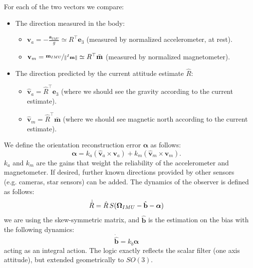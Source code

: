 \documentclass[10pt, a4paper]{report}
\begin{document}
\noindent For each of the two vectors we compare:\begin{itemize}
    \item The direction measured in the body:\begin{itemize}
        \item $\mathbf v_a=-\frac{\mathbf a_{IMU}}{g}\simeq R^\top\mathbf e_3$ (measured by normalized accelerometer, at rest).
        \item $\mathbf v_m=\nicefrac{\mathbf m_{IMU}}{\|{}^I\mathbf m\|}\simeq R^\top\bar{\mathbf m}$ (measured by normalized magnetometer).
    \end{itemize}
    \item The direction predicted by the current attitude estimate $\hat{R}$:\begin{itemize}
        \item  $\hat{\mathbf v}_a = \hat{R}^\top\mathbf e_3$ (where we should see the gravity according to the current estimate).
        \item $\hat{\mathbf v}_m = \hat{R}^\top \bar{\mathbf m}$ (where we should see magnetic north according to the current estimate).
    \end{itemize}
\end{itemize}
We define the orientation reconstruction error $\boldsymbol{\alpha}$ as follows:\begin{equation}
    \boldsymbol{\alpha}=k_a (\hat{\mathbf v}_a \times\mathbf  v_a) + k_m (\hat{\mathbf v}_m \times\mathbf  v_m).
\end{equation}
$k_a$ and $k_m$ are the gains that weight the reliability of the accelerometer and magnetometer. If desired, further known directions provided by other sensors (e.g. cameras, star sensors) can be added. The dynamics of the observer is defined as follows:\begin{equation}
    \dot{\hat R}=\hat R\, S({\boldsymbol{\Omega}}_{IMU}-\hat{\mathbf b}-\boldsymbol{\alpha})
\end{equation}
we are using the skew-symmetric matrix, and $\hat{\mathbf b}$ is the estimation on the bias with the following dynamics:\begin{equation}
    \dot{\hat{\mathbf b}}=k_b\boldsymbol{\alpha}
\end{equation} 
acting as an integral action. The logic exactly reflects the scalar filter (one axis attitude), but extended geometrically to $SO(3)$.
\end{document}
